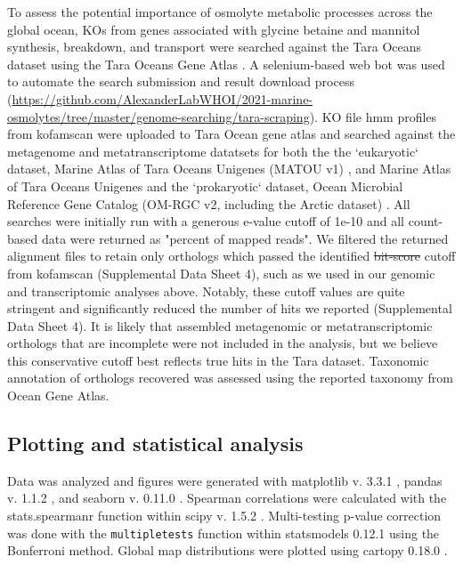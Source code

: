 \documentclass[utf8]{frontiersSCNS} %
\providecommand{\DIFaddtex}[1]{{\protect\color{blue}\uwave{#1}}} %
\providecommand{\DIFdeltex}[1]{{\protect\color{red}\sout{#1}}}                      %
\providecommand{\DIFaddbegin}{} %
\providecommand{\DIFaddend}{} %
\providecommand{\DIFdelbegin}{} %
\providecommand{\DIFdelend}{} %
\providecommand{\DIFadd}[1]{\texorpdfstring{\DIFaddtex{#1}}{#1}} %
\providecommand{\DIFdel}[1]{\texorpdfstring{\DIFdeltex{#1}}{}} %
\begin{document}
To assess the potential importance of osmolyte metabolic processes across the global ocean, KOs from genes associated with glycine betaine and mannitol synthesis, breakdown, and transport were searched against the \DIFaddbegin \DIFadd{surface data from the }\DIFaddend Tara Oceans dataset using the Tara Oceans Gene Atlas \citep{Villar_2018}. A selenium-based web bot was used to automate the search submission and result download process (\url{https://github.com/AlexanderLabWHOI/2021-marine-osmolytes/tree/master/genome-searching/tara-scraping}). KO file hmm profiles from kofamscan were uploaded to Tara Ocean gene atlas and searched against the metagenome and metatranscriptome datatsets for both the the `eukaryotic` dataset, Marine Atlas of Tara Oceans Unigenes (MATOU v1) \citep{Carradec2018}, and Marine Atlas of Tara Oceans Unigenes and the `prokaryotic` dataset, Ocean Microbial Reference Gene Catalog (OM-RGC v2, including the Arctic dataset) \citep{Salazar_2019}. All searches were initially run with a generous e-value cutoff of 1e-10 and all count-based data were returned as "percent of mapped reads". We filtered the returned alignment files to retain only orthologs which passed the identified \DIFdelbegin \DIFdel{bit-score }\DIFdelend \DIFaddbegin \DIFadd{bitscore }\DIFaddend cutoff from kofamscan (Supplemental Data Sheet 4), such as we used in our genomic and transcriptomic analyses above. Notably, these cutoff values are quite stringent and significantly reduced the number of hits we reported (Supplemental Data Sheet 4). It is likely that assembled metagenomic or metatranscriptomic orthologs that are incomplete were not included in the analysis, but we believe this conservative cutoff best reflects true hits in the Tara dataset. Taxonomic annotation of orthologs recovered was assessed using the reported taxonomy from Ocean Gene Atlas. 

\subsection{Plotting and statistical analysis}

Data was analyzed and figures were generated with matplotlib v. 3.3.1 \citep{Hunter:2007}, pandas v. 1.1.2 \citep{reback2020pandas}, and seaborn v. 0.11.0 \citep{waskom2020seaborn}. Spearman correlations were calculated with the stats.spearmanr function within scipy v. 1.5.2 \citep{2020SciPy-NMeth}. Multi-testing p-value correction was done with the \texttt{multipletests} function within statsmodels 0.12.1 using the Bonferroni method. Global map distributions were plotted using cartopy 0.18.0 \citep{Cartopy}.
\end{document}
